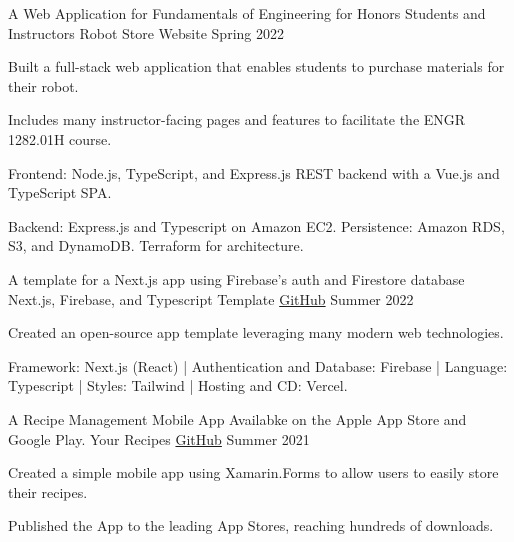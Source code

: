 
\begin{cventries}

  \cventry
    {A Web Application for Fundamentals of Engineering for Honors Students and Instructors} %
    {Robot Store Website} %
    {} %
    {Spring 2022} %
    {
      \begin{cvitems} %
        \item {Built a full-stack web application that enables students to purchase materials for their robot.}
        \item {Includes many instructor-facing pages and features to facilitate the ENGR 1282.01H course.}
        \item {Frontend: Node.js, TypeScript, and Express.js REST backend with a Vue.js and TypeScript SPA.}
        \item {Backend: Express.js and Typescript on Amazon EC2. Persistence: Amazon RDS, S3, and DynamoDB. Terraform for architecture.}
      \end{cvitems}
    }


    \cventry
    {A template for a Next.js app using Firebase's auth and Firestore database} %
    {Next.js, Firebase, and Typescript Template} %
    {\href{https://github.com/ahern55/next-firebase-typescript}{GitHub}} %
    {Summer 2022} %
    {
      \begin{cvitems} %
        \item {Created an open-source app template leveraging many modern web technologies.}
        \item {Framework: Next.js (React) | Authentication and Database: Firebase | Language: Typescript | Styles: Tailwind | Hosting and CD: Vercel.}
      \end{cvitems}
    }


  \cventry
    {A Recipe Management Mobile App Availabke on the Apple App Store and Google Play.} %
    {Your Recipes} %
    {\href{https://github.com/ahern55/recipes}{GitHub}} %
    {Summer 2021} %
    {
      \begin{cvitems} %
        \item {Created a simple mobile app using Xamarin.Forms to allow users to easily store their recipes.}
        \item {Published the App to the leading App Stores, reaching hundreds of downloads.}
      \end{cvitems}
    }

\end{cventries}
